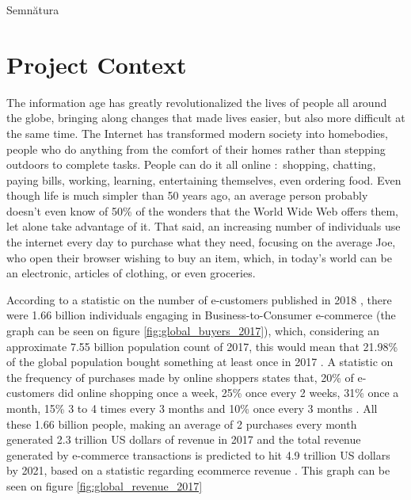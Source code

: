 \documentclass[12pt,a4paper,twoside]{report}
\begin{document}
\vspace{0.5cm}
\hspace{9.4cm}Semn\u{a}tura

\thispagestyle{empty}

\newpage

\tableofcontents
\newpage

\setcounter{page}{1}


\chapter{Project Context}
\pagestyle{headings}

The information age has greatly revolutionalized the lives of people all around the globe, bringing along changes that made lives easier, but also more difficult at the same time. The Internet has transformed modern society into homebodies, people who do anything from the comfort of their homes rather than stepping outdoors to complete tasks. People can do it all online : shopping, chatting, paying bills, working, learning, entertaining themselves, even ordering food. Even though life is much simpler than 50 years ago, an average person probably doesn't even know of 50\% of the wonders that the World Wide Web offers them, let alone take advantage of it. That said, an increasing number of individuals use the internet every day to purchase what they need, focusing on the average Joe, who open their browser wishing to buy an item, which, in today's world can be an electronic, articles of clothing, or even groceries.

According to a statistic on the number of e-customers published in 2018 \cite{global_buyers_2017}, there were 1.66 billion individuals engaging in Business-to-Consumer e-commerce (the graph can be seen on figure \ref{fig:global_buyers_2017}), which, considering an approximate 7.55 billion population count of 2017, this would mean that 21.98\% of the global population bought something at least once in 2017 . A statistic on the frequency of purchases made by online shoppers \cite{global_frequency_2018} states that, 20\% of e-customers did online shopping once a week, 25\% once every 2 weeks, 31\% once a month, 15\% 3 to 4 times every 3 months and 10\% once every 3 months . All these 1.66 billion people, making an average of 2 purchases every month generated 2.3 trillion US dollars of revenue in 2017 and the total revenue generated by e-commerce transactions is predicted to hit 4.9 trillion US dollars by 2021, based on a statistic regarding ecommerce revenue \cite{global_revenue_2017}. This graph can be seen on figure \ref{fig:global_revenue_2017}
\end{document}
